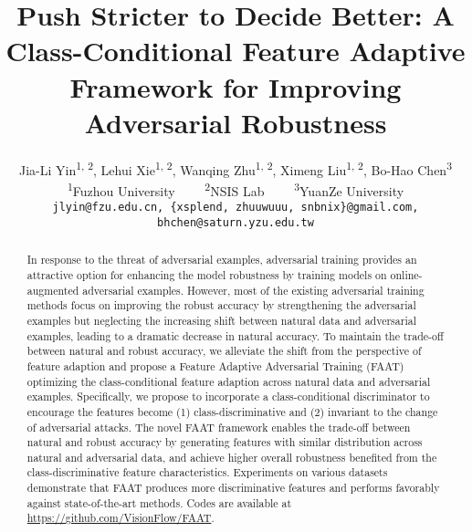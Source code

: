 \documentclass[10pt,twocolumn,letterpaper]{article}
\begin{document}
\title{Push Stricter to Decide Better: A Class-Conditional Feature Adaptive Framework for Improving Adversarial Robustness}

\author{
    Jia-Li Yin\textsuperscript{\rm 1, 2},
    Lehui Xie\textsuperscript{\rm 1, 2},
   Wanqing Zhu\textsuperscript{\rm 1, 2},
    Ximeng Liu\textsuperscript{\rm 1, 2},
    Bo-Hao Chen\textsuperscript{\rm 3}
    \\
    \textsuperscript{\rm 1}Fuzhou University ~~~~\textsuperscript{\rm 2}NSIS Lab ~~~~\textsuperscript{\rm 3}YuanZe University\\
     {\tt\small jlyin@fzu.edu.cn, \{xsplend, zhuuwuuu, snbnix\}@gmail.com, bhchen@saturn.yzu.edu.tw}
}



\maketitle

\begin{abstract}
In response to the threat of adversarial examples, adversarial training provides an attractive option for enhancing the model robustness by training models on online-augmented adversarial examples. However, most of the existing adversarial training methods focus on improving the robust accuracy by strengthening the adversarial examples but neglecting the increasing shift between natural data and adversarial examples, leading to a dramatic decrease in natural accuracy. To maintain the trade-off between natural and robust accuracy, we alleviate the shift from the perspective of feature adaption and propose a Feature Adaptive Adversarial Training (FAAT) optimizing the class-conditional feature adaption across natural data and adversarial examples. Specifically, we propose to incorporate a class-conditional discriminator to encourage the features become (1) class-discriminative and (2) invariant to the change of adversarial attacks. The novel FAAT framework enables the trade-off between natural and robust accuracy by generating features with similar distribution across natural and adversarial data, and achieve higher overall robustness benefited from the class-discriminative feature characteristics. Experiments on various datasets demonstrate that FAAT produces more discriminative features and performs favorably against state-of-the-art methods. Codes are available at \url{https://github.com/VisionFlow/FAAT}.
\end{abstract}
\end{document}
